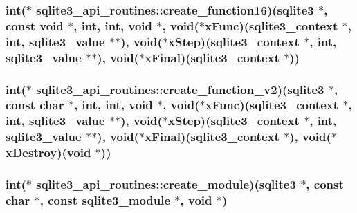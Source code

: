 \hypertarget{structsqlite3__api__routines_a0c3f05b118b89293ff5d35774504b44d}{
\subsubsection[{create\-\_\-function16}]{\setlength{\rightskip}{0pt plus 5cm}int($\ast$ sqlite3\-\_\-api\-\_\-routines\-::create\-\_\-function16)({\bf sqlite3} $\ast$, const void $\ast$, int, int, void $\ast$, void($\ast$x\-Func)({\bf sqlite3\-\_\-context} $\ast$, int, {\bf sqlite3\-\_\-value} $\ast$$\ast$), void($\ast$x\-Step)({\bf sqlite3\-\_\-context} $\ast$, int, {\bf sqlite3\-\_\-value} $\ast$$\ast$), void($\ast$x\-Final)({\bf sqlite3\-\_\-context} $\ast$))}}\label{structsqlite3__api__routines_a0c3f05b118b89293ff5d35774504b44d}
\hypertarget{structsqlite3__api__routines_ae2cd022f6c2bb188773ef656d79d26f1}{
\subsubsection[{create\-\_\-function\-\_\-v2}]{\setlength{\rightskip}{0pt plus 5cm}int($\ast$ sqlite3\-\_\-api\-\_\-routines\-::create\-\_\-function\-\_\-v2)({\bf sqlite3} $\ast$, const char $\ast$, int, int, void $\ast$, void($\ast$x\-Func)({\bf sqlite3\-\_\-context} $\ast$, int, {\bf sqlite3\-\_\-value} $\ast$$\ast$), void($\ast$x\-Step)({\bf sqlite3\-\_\-context} $\ast$, int, {\bf sqlite3\-\_\-value} $\ast$$\ast$), void($\ast$x\-Final)({\bf sqlite3\-\_\-context} $\ast$), void($\ast$x\-Destroy)(void $\ast$))}}\label{structsqlite3__api__routines_ae2cd022f6c2bb188773ef656d79d26f1}
\hypertarget{structsqlite3__api__routines_a25834b37191417562ecd2ee67b85617b}{
\subsubsection[{create\-\_\-module}]{\setlength{\rightskip}{0pt plus 5cm}int($\ast$ sqlite3\-\_\-api\-\_\-routines\-::create\-\_\-module)({\bf sqlite3} $\ast$, const char $\ast$, const {\bf sqlite3\-\_\-module} $\ast$, void $\ast$)}}\label{structsqlite3__api__routines_a25834b37191417562ecd2ee67b85617b}
